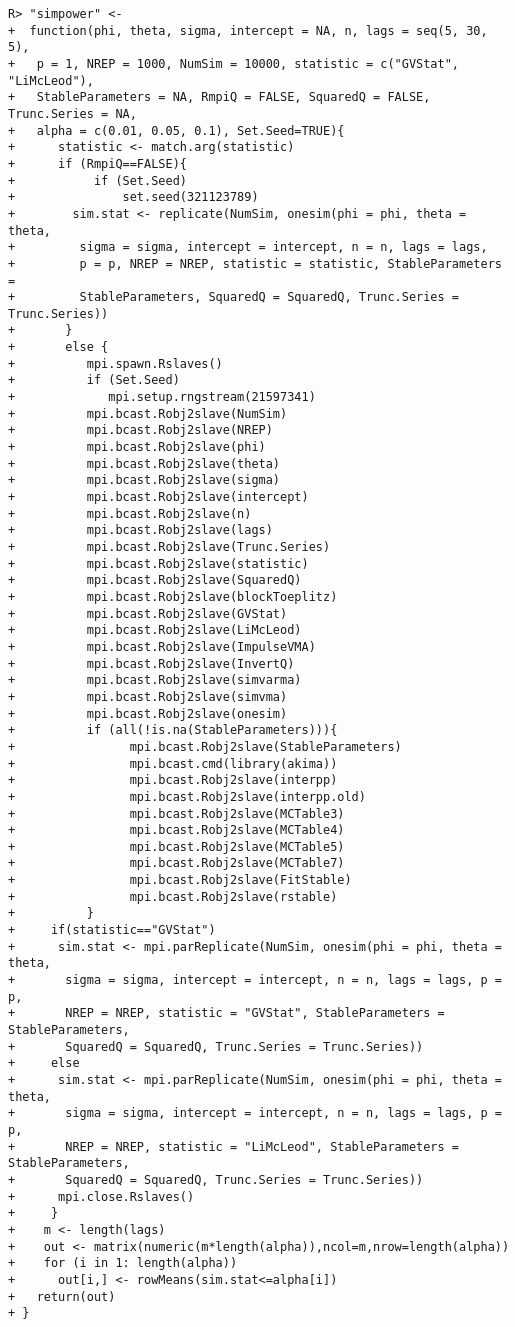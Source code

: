 \documentclass[article,nojss]{jss}
\begin{document}
\begin{verbatim}
R> "simpower" <-
+  function(phi, theta, sigma, intercept = NA, n, lags = seq(5, 30, 5), 
+   p = 1, NREP = 1000, NumSim = 10000, statistic = c("GVStat", "LiMcLeod"),
+   StableParameters = NA, RmpiQ = FALSE, SquaredQ = FALSE, Trunc.Series = NA,
+   alpha = c(0.01, 0.05, 0.1), Set.Seed=TRUE){
+      statistic <- match.arg(statistic)
+      if (RmpiQ==FALSE){ 
+           if (Set.Seed) 
+               set.seed(321123789) 
+        sim.stat <- replicate(NumSim, onesim(phi = phi, theta = theta,
+         sigma = sigma, intercept = intercept, n = n, lags = lags,
+         p = p, NREP = NREP, statistic = statistic, StableParameters =
+         StableParameters, SquaredQ = SquaredQ, Trunc.Series = Trunc.Series))
+       }
+       else {       
+          mpi.spawn.Rslaves()
+          if (Set.Seed)
+             mpi.setup.rngstream(21597341)
+          mpi.bcast.Robj2slave(NumSim)
+          mpi.bcast.Robj2slave(NREP)
+          mpi.bcast.Robj2slave(phi)
+          mpi.bcast.Robj2slave(theta)
+          mpi.bcast.Robj2slave(sigma)
+          mpi.bcast.Robj2slave(intercept)
+          mpi.bcast.Robj2slave(n)
+          mpi.bcast.Robj2slave(lags)
+          mpi.bcast.Robj2slave(Trunc.Series)
+          mpi.bcast.Robj2slave(statistic)
+          mpi.bcast.Robj2slave(SquaredQ)
+          mpi.bcast.Robj2slave(blockToeplitz)
+          mpi.bcast.Robj2slave(GVStat)
+          mpi.bcast.Robj2slave(LiMcLeod)
+          mpi.bcast.Robj2slave(ImpulseVMA)
+          mpi.bcast.Robj2slave(InvertQ)
+          mpi.bcast.Robj2slave(simvarma)
+          mpi.bcast.Robj2slave(simvma)
+          mpi.bcast.Robj2slave(onesim)
+          if (all(!is.na(StableParameters))){
+                mpi.bcast.Robj2slave(StableParameters)
+                mpi.bcast.cmd(library(akima))
+                mpi.bcast.Robj2slave(interpp)
+                mpi.bcast.Robj2slave(interpp.old)
+                mpi.bcast.Robj2slave(MCTable3)
+                mpi.bcast.Robj2slave(MCTable4)
+                mpi.bcast.Robj2slave(MCTable5)
+                mpi.bcast.Robj2slave(MCTable7)
+                mpi.bcast.Robj2slave(FitStable)
+                mpi.bcast.Robj2slave(rstable)
+          }
+     if(statistic=="GVStat")
+      sim.stat <- mpi.parReplicate(NumSim, onesim(phi = phi, theta = theta, 
+       sigma = sigma, intercept = intercept, n = n, lags = lags, p = p,
+       NREP = NREP, statistic = "GVStat", StableParameters = StableParameters,
+       SquaredQ = SquaredQ, Trunc.Series = Trunc.Series))
+     else
+      sim.stat <- mpi.parReplicate(NumSim, onesim(phi = phi, theta = theta, 
+       sigma = sigma, intercept = intercept, n = n, lags = lags, p = p, 
+       NREP = NREP, statistic = "LiMcLeod", StableParameters = StableParameters, 
+       SquaredQ = SquaredQ, Trunc.Series = Trunc.Series))
+      mpi.close.Rslaves()
+     }       
+    m <- length(lags)
+    out <- matrix(numeric(m*length(alpha)),ncol=m,nrow=length(alpha))
+    for (i in 1: length(alpha))
+      out[i,] <- rowMeans(sim.stat<=alpha[i])
+   return(out)
+ }
\end{verbatim}
\end{document}
